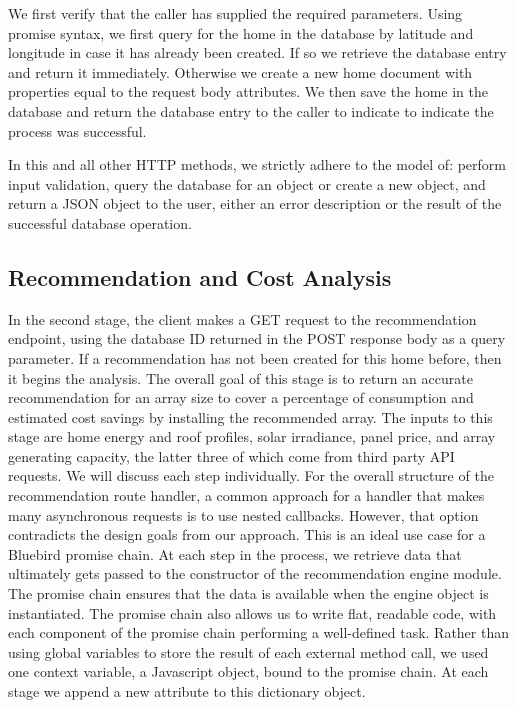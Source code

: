 \documentclass[pageno]{jpaper}
\begin{document}
We first verify that the caller has supplied the required parameters. Using promise syntax, we first query for the home in the database by latitude and longitude in case it has already been created. If so we retrieve the database entry and return it immediately. Otherwise we create a new home document with properties equal to the request body attributes. We then save the home in the database and return the database entry to the caller to indicate to indicate the process was successful.

In this and all other HTTP methods, we strictly adhere to the model of: perform input validation, query the database for an object or create a new object, and return a JSON object to the user, either an error description or the result of the successful database operation.

\subsection{Recommendation and Cost Analysis}
In the second stage, the client makes a GET request to the recommendation endpoint, using the database ID returned in the POST response body as a query parameter. If a recommendation has not been created for this home before, then it begins the analysis. The overall goal of this stage is to return an accurate recommendation for an array size to cover a percentage of consumption and estimated cost savings by installing the recommended array. The inputs to this stage are home energy and roof profiles, solar irradiance, panel price, and array generating capacity, the latter three of which come from third party API requests. We will discuss each step individually. For the overall structure of the recommendation route handler, a common approach for a handler that makes many asynchronous requests is to use nested callbacks. However, that option contradicts the design goals from our approach. This is an ideal use case for a Bluebird promise chain. At each step in the process, we retrieve data that ultimately gets passed to the constructor of the recommendation engine module. The promise chain ensures that the data is available when the engine object is instantiated. The promise chain also allows us to write flat, readable code, with each component of the promise chain performing a well-defined task. Rather than using global variables to store the result of each external method call, we used one context variable, a Javascript object, bound to the promise chain. At each stage we append a new attribute to this dictionary object.
\end{document}
